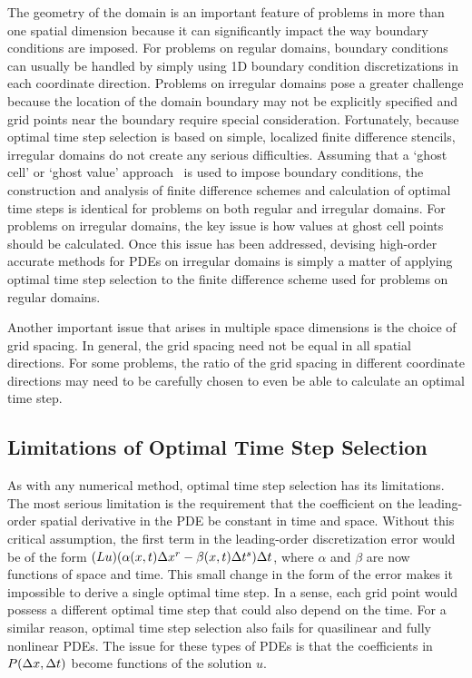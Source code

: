 \documentclass[oneeqnum,onefignum,onetabnum,onethmnum]{siamltex}
\begin{document}
The geometry of the domain is an important feature of problems in more than 
one spatial dimension because it can significantly impact the way boundary 
conditions are imposed.  For problems on regular domains, boundary conditions 
can usually be handled by simply using 1D boundary condition discretizations 
in each coordinate direction.  Problems on irregular domains pose a greater 
challenge because the location of the domain boundary may not be explicitly 
specified and grid points near the boundary require special consideration.  
Fortunately, because optimal time step selection is based on simple, localized 
finite difference stencils, irregular domains do not create any serious 
difficulties.  Assuming that a `ghost cell' or `ghost value' 
approach~\cite{fedkiw_1999, osher_fedkiw_book, gibou_2005} 
is used to impose boundary conditions, the construction and analysis of finite 
difference schemes and calculation of optimal time steps is identical for 
problems on both regular and irregular domains.  For problems on 
irregular domains, the key issue is how values at ghost cell points should 
be calculated.  Once this issue has been addressed, devising high-order 
accurate methods for PDEs on irregular domains is simply a matter of applying 
optimal time step selection to the finite difference scheme used for problems 
on regular domains. 

Another important issue that arises in multiple space dimensions is the choice
of grid spacing.  In general, the grid spacing need not be equal in all 
spatial directions.  For some problems, the ratio of the grid spacing in
different coordinate directions may need to be carefully chosen to even 
be able to calculate an optimal time step.  


\subsection{Limitations of Optimal Time Step Selection}
As with any numerical method, optimal time step selection has its limitations.
The most serious limitation is the requirement that the coefficient on the 
leading-order spatial derivative in the PDE be constant in time and space.  
Without this critical assumption, the first term in the leading-order 
discretization error would be of the form 
$(L u) (\alpha(x,t) \Delta x^r - \beta(x,t) \Delta t^s) \Delta t$,
where $\alpha$ and $\beta$ are now functions of space and time.  This
small change in the form of the error makes it impossible to derive a single 
optimal time step.  In a sense, each grid point would possess a different 
optimal time step that could also depend on the time.  For a similar reason, 
optimal time step selection also fails for quasilinear and fully nonlinear 
PDEs.  The issue for these types of PDEs is that the coefficients in 
$P(\Delta x, \Delta t)$ become functions of the solution $u$.
\end{document}
